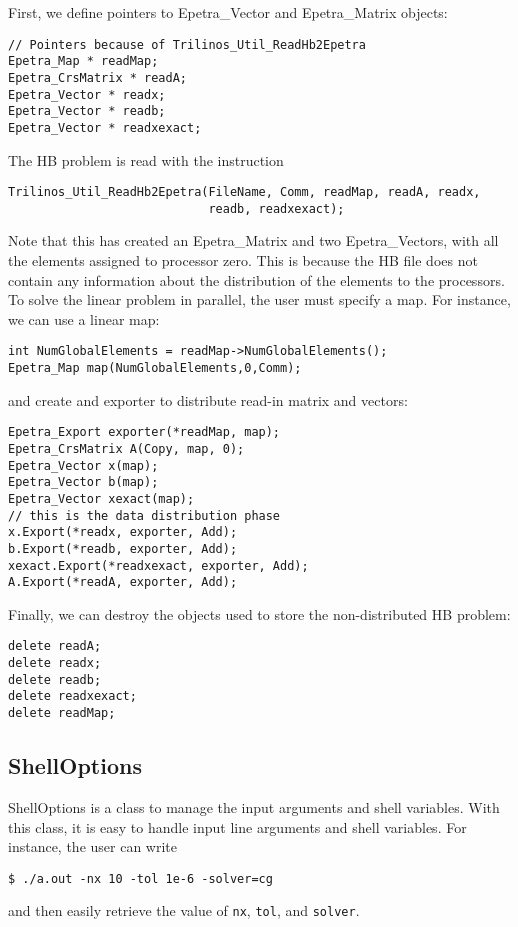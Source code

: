 First, we define pointers to Epetra\_Vector and Epetra\_Matrix objects:
\begin{verbatim}
// Pointers because of Trilinos_Util_ReadHb2Epetra
Epetra_Map * readMap;
Epetra_CrsMatrix * readA; 
Epetra_Vector * readx; 
Epetra_Vector * readb;
Epetra_Vector * readxexact;
\end{verbatim}
The HB problem is read with the instruction
\begin{verbatim}
Trilinos_Util_ReadHb2Epetra(FileName, Comm, readMap, readA, readx, 
                            readb, readxexact);   
\end{verbatim}
Note that this has created an Epetra\_Matrix and two Epetra\_Vectors,
with all the elements assigned to processor zero. This is because the HB
file does not contain any information about the distribution of the
elements to the processors. To solve the linear problem in parallel, the
user must specify a map.  For instance, we can use a linear map:
\begin{verbatim}
int NumGlobalElements = readMap->NumGlobalElements();
Epetra_Map map(NumGlobalElements,0,Comm);
\end{verbatim}
and create and exporter to distribute read-in matrix and vectors:
\begin{verbatim}
Epetra_Export exporter(*readMap, map);
Epetra_CrsMatrix A(Copy, map, 0);
Epetra_Vector x(map);
Epetra_Vector b(map);
Epetra_Vector xexact(map);
// this is the data distribution phase
x.Export(*readx, exporter, Add);
b.Export(*readb, exporter, Add);
xexact.Export(*readxexact, exporter, Add);
A.Export(*readA, exporter, Add);
\end{verbatim}
Finally, we can destroy the objects used to store the non-distributed HB
problem:
\begin{verbatim}
delete readA;
delete readx;
delete readb;
delete readxexact;
delete readMap;
\end{verbatim}


\subsection{ShellOptions}

ShellOptions is a class to manage the input arguments and shell
variables.  With this class, it is easy to handle input line arguments
and shell variables. For instance, the user can write 
\begin{verbatim}
$ ./a.out -nx 10 -tol 1e-6 -solver=cg 
\end{verbatim}
and then easily retrieve the value of {\tt nx}, {\tt tol}, and {\tt solver}.
 
